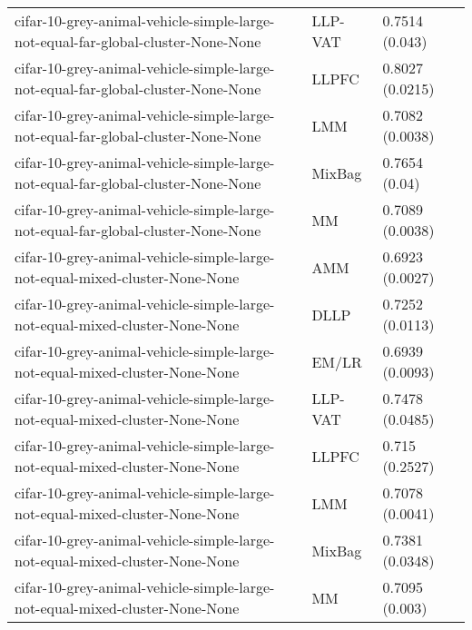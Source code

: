 \begin{longtable}{lll}
                             cifar-10-grey-animal-vehicle-simple-large-not-equal-far-global-cluster-None-None &   LLP-VAT &                        0.7514 (0.043) \\
                             cifar-10-grey-animal-vehicle-simple-large-not-equal-far-global-cluster-None-None &     LLPFC &                       0.8027 (0.0215) \\
                             cifar-10-grey-animal-vehicle-simple-large-not-equal-far-global-cluster-None-None &       LMM &                       0.7082 (0.0038) \\
                             cifar-10-grey-animal-vehicle-simple-large-not-equal-far-global-cluster-None-None &    MixBag &                         0.7654 (0.04) \\
                             cifar-10-grey-animal-vehicle-simple-large-not-equal-far-global-cluster-None-None &        MM &                       0.7089 (0.0038) \\
                                  cifar-10-grey-animal-vehicle-simple-large-not-equal-mixed-cluster-None-None &       AMM &                       0.6923 (0.0027) \\
                                  cifar-10-grey-animal-vehicle-simple-large-not-equal-mixed-cluster-None-None &      DLLP &                       0.7252 (0.0113) \\
                                  cifar-10-grey-animal-vehicle-simple-large-not-equal-mixed-cluster-None-None &     EM/LR &                       0.6939 (0.0093) \\
                                  cifar-10-grey-animal-vehicle-simple-large-not-equal-mixed-cluster-None-None &   LLP-VAT &                       0.7478 (0.0485) \\
                                  cifar-10-grey-animal-vehicle-simple-large-not-equal-mixed-cluster-None-None &     LLPFC &                        0.715 (0.2527) \\
                                  cifar-10-grey-animal-vehicle-simple-large-not-equal-mixed-cluster-None-None &       LMM &                       0.7078 (0.0041) \\
                                  cifar-10-grey-animal-vehicle-simple-large-not-equal-mixed-cluster-None-None &    MixBag &                       0.7381 (0.0348) \\
                                  cifar-10-grey-animal-vehicle-simple-large-not-equal-mixed-cluster-None-None &        MM &                        0.7095 (0.003) \\

\end{longtable}
